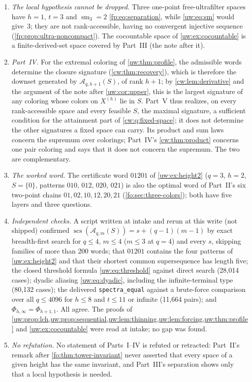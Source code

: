 \documentclass[11pt,letterpaper]{article}
\numberwithin{equation}{section}
\theoremstyle{definition}
\theoremstyle{remark}
\theoremstyle{definition}
\newcommand{\sm}{\operatorname{sm}}
\newcommand{\A}{\mathcal A}
\newcommand{\scs}{\operatorname{scs}}
\begin{document}
\begin{enumerate}
$\Lambda_2(X)=h+\min(2,t)$, which is Part~I's maximum layer count $h+1$ or
$h+2$ in \cref{thm:height}; Part~I needs no local hypothesis there (the note
after \cref{fo:q:invariants}).  and \cref{uw:cor:sums}
at $q=2$ give Part~I's \cref{cor:product} and \cref{thm:height} applied to
a sum.
\item \emph{The local hypothesis cannot be dropped.} Three one-point
free-ultrafilter spaces have $h=1$, $t=3$ and $\sm_3=2$
\eqref{fp:eq:separation}, while \eqref{uw:eq:sm} would give~$3$; they are not
rank-accessible, having no convergent injective sequence
(\cref{fp:prop:ultra-noncompact}). The cocountable space of
\cref{uw:ex:cocountable} is a finite-derived-set space covered by Part~III
(the note after it).
\item \emph{Part~IV.} For the extremal coloring of \cref{uw:thm:profile},
the admissible words determine the closure signature
(\cref{cw:thm:recovery}), which is therefore the downset generated by
$\A_{q,h+1}(S)$, of rank $h+1$; by \cref{cw:lem:derivative} and the
argument of the note after \cref{uw:cor:upper}, this is the largest
signature of any coloring whose colors on $X^{(h)}$ lie in $S$. Part~V thus realizes,
on every rank-accessible space and every feasible $S$, the maximal
signature, a sufficient condition for the attainment part of
\cref{cw:q:fixed-space}; it does not determine the other signatures a fixed
space can carry. Its product and sum laws concern the supremum over
colorings; Part~IV's \cref{cw:thm:product} concerns one pair coloring and
says that it does not concern the supremum. The two are complementary.
\item \emph{The worked word.} The certificate word $01201$ of
\cref{uw:ex:height2} ($q=3$, $h=2$, $S=\{0\}$, patterns $010$, $012$, $020$,
$021$) is also the optimal word of Part~II's six two-point chains
$01,02,10,12,20,21$ (\cref{fo:sec:three-colors}); both have five layers and
three questions.
\item \emph{Independent checks.} A script written at intake and rerun at
this write (not shipped) confirmed $\scs(\A_{q,m}(S))=s+(q-1)(m-1)$ by
exact breadth-first search for $q\le4$, $m\le4$ ($m\le3$ at $q=4$) and every
$s$, skipping families of more than 200 words; that $01201$
contains the four patterns of \cref{uw:ex:height2} and that their shortest
common supersequence has length five; the closed threshold formula
\eqref{uw:eq:threshold} against direct search (28,014 cases); dyadic
aliasing \eqref{uw:eq:dyadic}, including the infinite-terminal type (80,132
cases); the delivered \texttt{spectra\_equal} against a brute-force
comparison over all $q\le4096$ for $h\le8$ and $t\le11$ or infinite (11,664
pairs); and $\Phi_{h,\infty}=\Phi_{h+1,1}$. All agree. The proofs of
\cref{uw:prop:lch,uw:prop:sequential,uw:lem:thinning,uw:lem:forcing,uw:thm:profile}
and \cref{uw:ex:cocountable} were read at intake; no gap was found.
\item \emph{No refutation.} No statement of Parts~I--IV is refuted or
retracted: Part~II's remark after \cref{fo:thm:tower-invariant} never
asserted that every space of a given height has the same invariant, and
Part~III's separation shows only that a local hypothesis is needed.
\end{enumerate}
\end{document}
